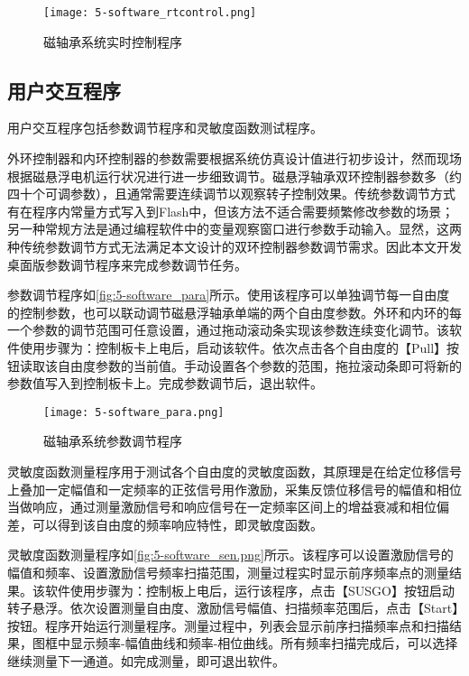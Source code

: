 \begin{figure}
	\texttt{[image: 5-software\_rtcontrol.png]}
	\caption{磁轴承系统实时控制程序}
	\label{fig:5-software_rtcontrol}
\end{figure}

\subsection{用户交互程序}
用户交互程序包括参数调节程序和灵敏度函数测试程序。

外环控制器和内环控制器的参数需要根据系统仿真设计值进行初步设计，然而现场根据磁悬浮电机运行状况进行进一步细致调节。磁悬浮轴承双环控制器参数多（约四十个可调参数），且通常需要连续调节以观察转子控制效果。传统参数调节方式有在程序内常量方式写入到Flash中，但该方法不适合需要频繁修改参数的场景；另一种常规方法是通过编程软件中的变量观察窗口进行参数手动输入。显然，这两种传统参数调节方式无法满足本文设计的双环控制器参数调节需求。因此本文开发桌面版参数调节程序来完成参数调节任务。

参数调节程序如\autoref{fig:5-software_para}所示。使用该程序可以单独调节每一自由度的控制参数，也可以联动调节磁悬浮轴承单端的两个自由度参数。外环和内环的每一个参数的调节范围可任意设置，通过拖动滚动条实现该参数连续变化调节。该软件使用步骤为：控制板卡上电后，启动该软件。依次点击各个自由度的【Pull】按钮读取该自由度参数的当前值。手动设置各个参数的范围，拖拉滚动条即可将新的参数值写入到控制板卡上。完成参数调节后，退出软件。

\begin{figure}
	\texttt{[image: 5-software\_para.png]}
	\caption{磁轴承系统参数调节程序}
	\label{fig:5-software_para}
\end{figure}

灵敏度函数测量程序用于测试各个自由度的灵敏度函数，其原理是在给定位移信号上叠加一定幅值和一定频率的正弦信号用作激励，采集反馈位移信号的幅值和相位当做响应，通过测量激励信号和响应信号在一定频率区间上的增益衰减和相位偏差，可以得到该自由度的频率响应特性，即灵敏度函数。

灵敏度函数测量程序如\autoref{fig:5-software_sen.png}所示。该程序可以设置激励信号的幅值和频率、设置激励信号频率扫描范围，测量过程实时显示前序频率点的测量结果。该软件使用步骤为：控制板上电后，运行该程序，点击【SUSGO】按钮启动转子悬浮。依次设置测量自由度、激励信号幅值、扫描频率范围后，点击【Start】按钮。程序开始运行测量程序。测量过程中，列表会显示前序扫描频率点和扫描结果，图框中显示频率-幅值曲线和频率-相位曲线。所有频率扫描完成后，可以选择继续测量下一通道。如完成测量，即可退出软件。


